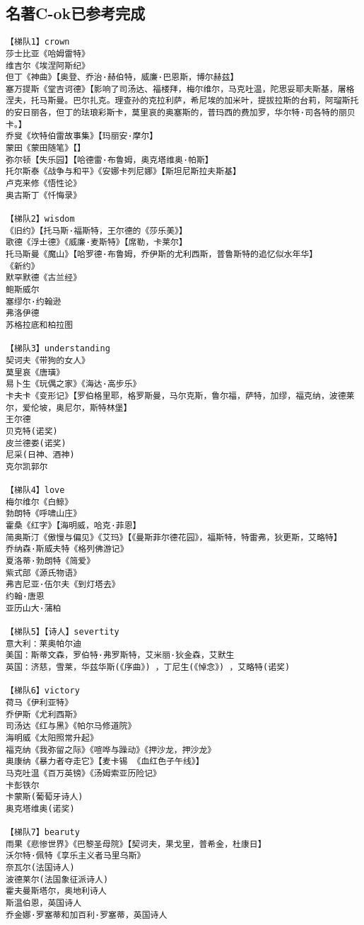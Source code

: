 \documentclass[UTF8]{../RepresentationUniverse}
\begin{document}
\subsection{名著C-ok已参考完成}

\begin{lstlisting}
【梯队1】crown
莎士比亚《哈姆雷特》
维吉尔《埃涅阿斯纪》
但丁《神曲》【奥登、乔治·赫伯特，威廉·巴恩斯，博尔赫兹】
塞万提斯《堂吉诃德》【影响了司汤达、福楼拜，梅尔维尔，马克吐温，陀思妥耶夫斯基，屠格涅夫，托马斯曼。巴尔扎克。理查孙的克拉利萨，希尼埃的加米叶，提拔拉斯的台莉，阿瑠斯托的安日丽各，但丁的珐琅彩斯卡，莫里哀的奥塞斯的，普玛西的费加罗，华尔特·司各特的丽贝卡。】
乔叟《坎特伯雷故事集》【玛丽安·摩尔】
蒙田《蒙田随笔》【】
弥尔顿【失乐园】【哈德雷·布鲁姆，奥克塔维奥·帕斯】
托尔斯泰《战争与和平》《安娜卡列尼娜》【斯坦尼斯拉夫斯基】
卢克来修《悟性论》
奥古斯丁《忏悔录》

【梯队2】wisdom
《旧约》【托马斯·福斯特，王尔德的《莎乐美》】
歌德《浮士德》《威廉·麦斯特》【席勒，卡莱尔】
托马斯曼《魔山》【哈罗德·布鲁姆，乔伊斯的尤利西斯，普鲁斯特的追忆似水年华】
《新约》
默罕默德《古兰经》
鲍斯威尔
塞缪尔·约翰逊
弗洛伊德
苏格拉底和柏拉图

【梯队3】understanding
契诃夫《带狗的女人》
莫里哀《唐璜》
易卜生《玩偶之家》《海达·高步乐》
卡夫卡《变形记》【罗伯格里耶，格罗斯曼，马尔克斯，鲁尔福，萨特，加缪，福克纳，波德莱尔，爱伦坡，奥尼尔，斯特林堡】
王尔德
贝克特(诺奖) 
皮兰德娄(诺奖) 
尼采(日神、酒神) 
克尔凯郭尔

【梯队4】love
梅尔维尔《白鲸》
勃朗特《呼啸山庄》
霍桑《红字》【海明威，哈克·菲恩】
简奥斯汀《傲慢与偏见》《艾玛》【《曼斯菲尔德花园》，福斯特，特雷弗，狄更斯，艾略特】
乔纳森·斯威夫特《格列佛游记》
夏洛蒂·勃朗特《简爱》
紫式部《源氏物语》
弗吉尼亚·伍尔夫《到灯塔去》
约翰·唐恩
亚历山大·蒲柏

【梯队5】【诗人】severtity
意大利：莱奥帕尔迪
美国：斯蒂文森，罗伯特·弗罗斯特，艾米丽·狄金森，艾默生
英国：济慈，雪莱，华兹华斯(《序曲》) ，丁尼生(《悼念》) ，艾略特(诺奖) 

【梯队6】victory
荷马《伊利亚特》
乔伊斯《尤利西斯》
司汤达《红与黑》《帕尔马修道院》
海明威《太阳照常升起》
福克纳《我弥留之际》《喧哗与躁动》《押沙龙，押沙龙》
奥康纳《暴力者夺走它》【麦卡锡 《血红色子午线》】
马克吐温《百万英镑》《汤姆索亚历险记》
卡彭铁尔
卡蒙斯(葡萄牙诗人) 
奥克塔维奥(诺奖) 

【梯队7】bearuty
雨果《悲惨世界》《巴黎圣母院》【契诃夫，果戈里，普希金，杜康日】
沃尔特·佩特《享乐主义者马里乌斯》
奈瓦尔(法国诗人) 
波德莱尔(法国象征派诗人) 
霍夫曼斯塔尔，奥地利诗人
斯温伯恩，英国诗人
乔金娜·罗塞蒂和加百利·罗塞蒂，英国诗人


\end{lstlisting}
\end{document}
